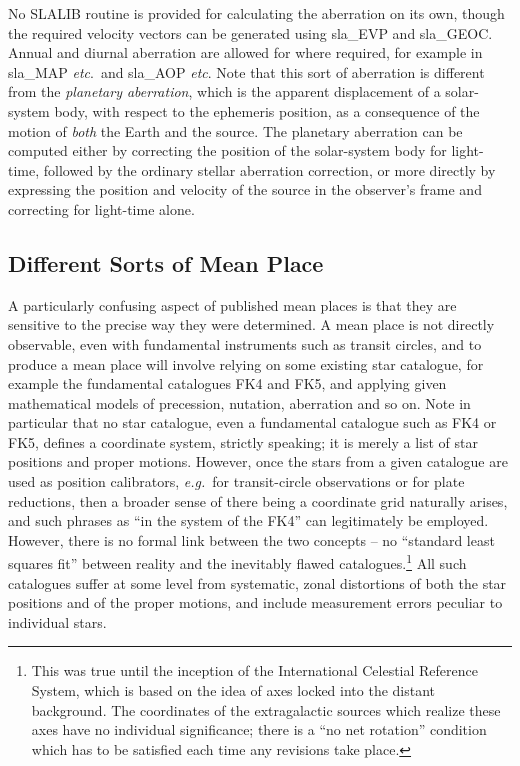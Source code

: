 \documentclass[11pt,twoside]{article}
\begin{document}
No SLALIB routine is provided for calculating the aberration on
its own, though the required velocity vectors can be
generated using
sla\_EVP
and
sla\_GEOC.
Annual and diurnal aberration are allowed for where required, for example in
sla\_MAP
{\it etc}.\ and
sla\_AOP
{\it etc}.  Note that this sort
of aberration is different from the {\it planetary
aberration}, which is the apparent displacement of a solar-system
body, with respect to the ephemeris position, as a consequence
of the motion of {\it both}\/ the Earth and the source.  The
planetary aberration can be computed either by correcting the
position of the solar-system body for light-time, followed by
the ordinary stellar aberration correction, or more
directly by expressing the position and velocity of the source
in the observer's frame and correcting for light-time alone.

\subsection{Different Sorts of Mean Place}
A particularly confusing aspect of published mean places is that they
are sensitive to the precise way they were determined.  A mean
place is not directly observable, even with fundamental
instruments such as transit circles, and to produce a mean
place will involve relying on some existing star catalogue,
for example the fundamental catalogues FK4 and FK5,
and applying given mathematical models of precession, nutation,
aberration and so on.
Note in particular that no star catalogue,
even a fundamental catalogue such as FK4 or
FK5, defines a coordinate system, strictly speaking;
it is merely a list of star positions and proper motions.
However, once the stars from a given catalogue
are used as position calibrators, {\it e.g.}\ for
transit-circle observations or for plate reductions, then a
broader sense of there being a coordinate grid naturally
arises, and such phrases as ``in the system of
the FK4'' can legitimately be employed.  However,
there is no formal link between the
two concepts -- no ``standard least squares fit'' between
reality and the inevitably flawed catalogues.\footnote{This was
true until the inception of the International Celestial Reference
System, which is based on the idea of axes locked into the
distant background.  The coordinates
of the extragalactic sources which realize these
axes have no individual significance; there is a ``no net rotation''
condition which has to be satisfied each time any revisions take
place.}  All such
catalogues suffer at some level from systematic, zonal distortions
of both the star positions and of the proper motions,
and include measurement errors peculiar to individual
stars.
\end{document}
